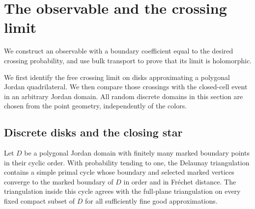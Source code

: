 \section{The observable and the crossing limit}
\label{sec:observable}

We construct an observable with a boundary coefficient equal to the
desired crossing probability, and use bulk transport to prove that its
limit is holomorphic.

We first identify the free crossing limit on disks approximating a
polygonal Jordan quadrilateral. We then compare those crossings with the
closed-cell event in an arbitrary Jordan domain. All random discrete
domains in this section are chosen from the point geometry, independently
of the colors.

\subsection{Discrete disks and the closing star}

\begin{lemma}
\label{lemma:polygonal-disks}
Let $D$ be a polygonal Jordan domain with finitely many marked boundary
points in their cyclic order. With probability tending to one, the
Delaunay triangulation contains a simple primal cycle whose boundary and
selected marked vertices converge to the marked boundary of $D$ in order
and in Fr\'echet distance. The triangulation inside this cycle agrees with
the full-plane triangulation on every fixed compact subset of $D$ for
all sufficiently fine good approximations.
\end{lemma}

